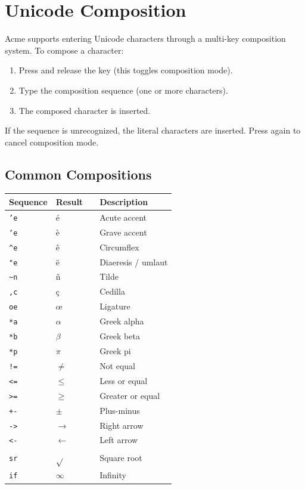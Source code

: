 \section{Unicode Composition}
\label{sec:compose}


Acme supports entering Unicode characters through a multi-key
composition system.  To compose a character:

\begin{enumerate}
\item Press and release the  key (this toggles composition mode).
\item Type the composition sequence (one or more characters).
\item The composed character is inserted.
\end{enumerate}

If the sequence is unrecognized, the literal characters are inserted.
Press  again to cancel composition mode.

\subsection{Common Compositions}

\begin{longtable}{@{}llll@{}}
\toprule
Sequence & Result & & Description \\
\midrule
\endhead
\texttt{'e} & \'{e} & & Acute accent \\
\texttt{`e} & \`{e} & & Grave accent \\
\texttt{\^{}e} & \^{e} & & Circumflex \\
\texttt{"e} & \"{e} & & Diaeresis / umlaut \\
\texttt{\~{}n} & \~{n} & & Tilde \\
\texttt{,c} & \c{c} & & Cedilla \\
\texttt{oe} & \oe & & Ligature \\
\texttt{*a} & $\alpha$ & & Greek alpha \\
\texttt{*b} & $\beta$ & & Greek beta \\
\texttt{*p} & $\pi$ & & Greek pi \\
\texttt{!=} & $\neq$ & & Not equal \\
\texttt{<=} & $\leq$ & & Less or equal \\
\texttt{>=} & $\geq$ & & Greater or equal \\
\texttt{+-} & $\pm$ & & Plus-minus \\
\texttt{->} & $\rightarrow$ & & Right arrow \\
\texttt{<-} & $\leftarrow$ & & Left arrow \\
\texttt{sr} & $\sqrt{}$ & & Square root \\
\texttt{if} & $\infty$ & & Infinity \\
\bottomrule
\end{longtable}


